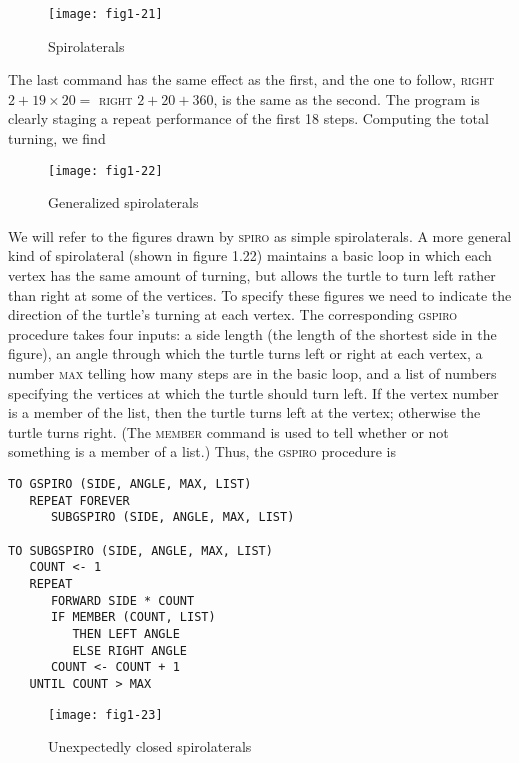 \documentclass{book}
\begin{document}
\begin{figure}
\begin{center}
\texttt{[image: fig1-21]}
\caption{Spirolaterals}
\end{center}
\end{figure}

The last command has the same effect as the first, and the one to follow,
\textsc{right} $2 + 19 \times 20 =$ \textsc{right} $2 + 20 + 360$, is the same as the
second. The program is clearly staging a repeat performance of the first
18 steps. Computing the total turning, we find

\begin{figure}
\begin{center}
\texttt{[image: fig1-22]}
\caption{Generalized spirolaterals}
\end{center}
\end{figure}

We will refer to the figures drawn by \textsc{spiro} as simple spirolaterals. A
more general kind of spirolateral (shown in figure 1.22) maintains a basic
loop in which each vertex has the same amount of turning, but allows the
turtle to turn left rather than right at some of the vertices. To specify
these figures we need to indicate the direction of the turtle's turning
at each vertex. The corresponding \textsc{gspiro} procedure takes four inputs:
a side length (the length of the shortest side in the figure), an angle
through which the turtle turns left or right at each vertex, a number
\textsc{max} telling how many steps are in the basic loop, and a list of numbers
specifying the vertices at which the turtle should turn left. If the vertex
number is a member of the list, then the turtle turns left at the vertex;
otherwise the turtle turns right. (The \textsc{member} command is used to tell
whether or not something is a member of a list.) Thus, the \textsc{gspiro}
procedure is

\begin{verbatim}
TO GSPIRO (SIDE, ANGLE, MAX, LIST)
   REPEAT FOREVER
      SUBGSPIRO (SIDE, ANGLE, MAX, LIST)

TO SUBGSPIRO (SIDE, ANGLE, MAX, LIST)
   COUNT <- 1
   REPEAT
      FORWARD SIDE * COUNT
      IF MEMBER (COUNT, LIST)
         THEN LEFT ANGLE
         ELSE RIGHT ANGLE
      COUNT <- COUNT + 1
   UNTIL COUNT > MAX
\end{verbatim}
\begin{figure}
\begin{center}
\texttt{[image: fig1-23]}
\caption{Unexpectedly closed spirolaterals}
\end{center}
\end{figure}
\end{document}
